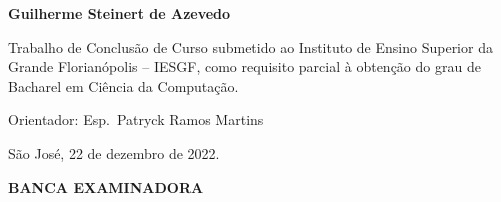 \begin{center}
    \textbf{Guilherme Steinert de Azevedo}

    \vspace*{1.5cm}

    \textbf{\seniorThesisTitle}

    \vspace*{1cm}

    \begin{sidecite}
        Trabalho de Conclusão de Curso submetido ao Instituto de
        Ensino Superior da Grande Florianópolis – IESGF, como
        requisito parcial à obtenção do grau de Bacharel em Ciência
        da Computação.

        Orientador: Esp.\ Patryck Ramos Martins

        \vspace{\onelineskip}
        São José, 22 de dezembro de 2022.

    \end{sidecite}

    \vspace*{1cm}

    \textbf{\uppercase{Banca examinadora}}


    \vfill

\end{center}
\newpage



















